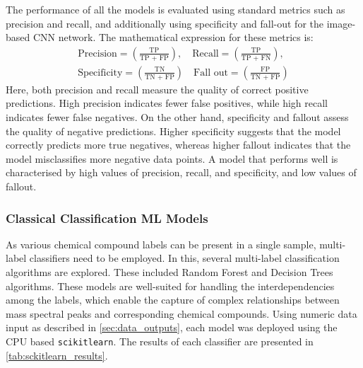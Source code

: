 The performance of all the models is evaluated using standard metrics such as precision and recall, and additionally using specificity and fall-out for the image-based CNN network. The mathematical expression for these metrics is:
\begin{equation}
    \begin{split}
        \text{Precision} = \left( \frac{\text {TP}}{\text {TP + FP}} \right), \quad  \text{Recall}    = \left( \frac{\text {TP}}{\text {TP + FN}} \right), \\
        \text{Specificity} = \left( \frac{\text {TN}}{\text {TN + FP}} \right) \quad  \text{Fall out} = \left( \frac{\text {FP}}{\text {TN + FP}} \right)
    \end{split}
\end{equation}
Here, both precision and recall measure the quality of correct positive predictions. High precision indicates fewer false positives, while high recall indicates fewer false negatives. On the other hand, specificity and fallout assess the quality of negative predictions. Higher specificity suggests that the model correctly predicts more true negatives, whereas higher fallout indicates that the model misclassifies more negative data points. A model that performs well is characterised by high values of precision, recall, and specificity, and low values of fallout.

\subsubsection{Classical Classification ML Models}

As various chemical compound labels can be present in a single sample, multi-label classifiers need to be employed. In this, several multi-label classification algorithms are explored. 
These included Random Forest and Decision Trees algorithms. These models are well-suited for handling the interdependencies among the labels, which enable the capture of complex relationships between mass spectral peaks and corresponding chemical compounds. 
Using numeric data input as described in \cref{sec:data_outputs}, each model was deployed using the CPU based \texttt{scikitlearn}. The results of each classifier are presented in \cref{tab:sckitlearn_results}. \\


